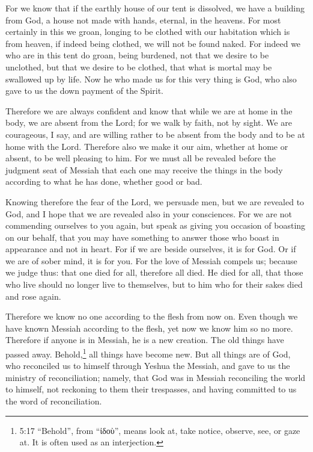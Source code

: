 \mychapter{} \myverse*{}For we know that if the earthly house of our tent is dissolved,
we have a building from God, a house not made with hands, eternal, in the heavens.
\myverse{}For most certainly in this we groan, longing to be clothed with our habitation
which is from heaven,
\myverse{}if indeed being clothed, we will not be found naked.
\myverse{}For indeed we who are in this tent do groan, being burdened, not that we desire
to be unclothed, but that we desire to be clothed, that what is mortal may be swallowed up by life.
\myverse{}Now he who made us for this very thing is God, who also gave to us the down
payment of the Spirit.

\myverse{}Therefore we are always confident and know that while we are at
home in the body, we are absent from the Lord;
\myverse{}for we walk by faith, not by sight.
\myverse{}We are courageous, I say, and are willing rather to be absent from the body
and to be at home with the Lord.
\myverse{}Therefore also we make it our aim, whether at home or absent, to be well pleasing
to him.
\myverse{}For we must all be revealed before the judgment seat of Messiah that each
one may receive the things in the body according to what he has done, whether good or bad.

\myverse{}Knowing therefore the fear of the Lord, we persuade men, but
we are revealed to God, and I hope that we are revealed also in your consciences.
\myverse{}For we are not commending ourselves to you again, but speak as giving you
occasion of boasting on our behalf, that you may have something to answer those who boast in appearance
and not in heart.
\myverse{}For if we are beside ourselves, it is for God. Or if we are of sober mind,
it is for you.
\myverse{}For the love of Messiah compels us; because we judge thus: that one died for
all, therefore all died.
\myverse{}He died for all, that those who live should no longer live to themselves,
but to him who for their sakes died and rose again.

\myverse{}Therefore we know no one according to the flesh from now on.
Even though we have known Messiah according to the flesh, yet now we know him so no more.
\myverse{}Therefore if anyone is in Messiah, he is a new creation. The old things have
passed away. Behold,\footnote{5:17 “Behold”, from “ἰδοὺ”, means look at, take notice, observe, see, or gaze at. It is often used
	as an interjection.} all things have become new.
\myverse{}But all things are of God, who reconciled us to himself through Yeshua the Messiah,
and gave to us the ministry of reconciliation;
\myverse{}namely, that God was in Messiah reconciling the world to himself, not reckoning
to them their trespasses, and having committed to us the word of reconciliation.

